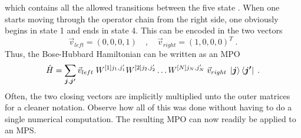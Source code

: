 which contains all the allowed transitions between the five state \cite{schollwock}. When one starts moving through the operator chain from the right side, one obviously begins in state 1 and ends in state 4. This can be encoded in the two vectors
\begin{equation*}
 \vec{v}_{left} = (0 , 0 , 0  , 1) \quad , \quad \vec{v}_{right} = (1  , 0 ,0 , 0)^T \; .
\end{equation*}
Thus, the Bose-Hubbard Hamiltonian can be written as an MPO 
\begin{equation}
	\hat{H} = \sum_{\boldsymbol{j}, \boldsymbol{j'}} \vec{v}_{left} \; W^{[1] j_1 , j_1 '} W^{[2] j_2 , j_2 '} \ldots W^{[N] j_N , j_N '} \; \vec{v}_{right} \; \ket{\boldsymbol{j}} \bra{\boldsymbol{j'}} \; .
	\label{eq:MPOhamiltonian}
\end{equation}
Often, the two closing vectors are implicitly multiplied unto the outer matrices for a cleaner notation. Observe how all of this was done without having to do a single numerical computation. The resulting MPO can now readily be applied to an MPS.